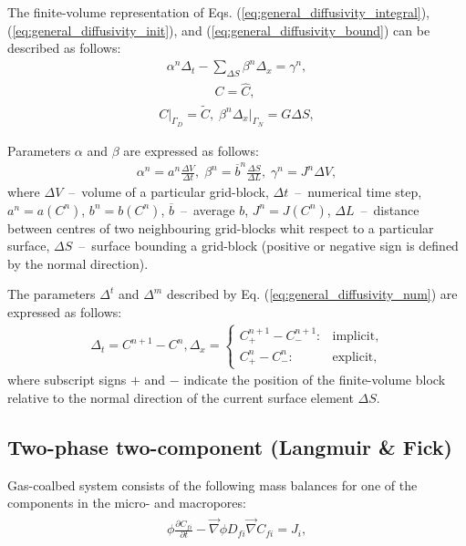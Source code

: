 \documentclass[a4paper,14pt,english]{extreport}
\begin{document}
The finite-volume representation of Eqs. (\ref{eq:general_diffusivity_integral}), (\ref{eq:general_diffusivity_init}), and (\ref{eq:general_diffusivity_bound}) can be described as follows:
    \begin{eqnarray}
        \label{eq:general_diffusivity_num}
        \alpha^n \Delta_{t} - \sum_{\Delta S} \beta^n\Delta_{x} = \gamma^n,
    \end{eqnarray}
    \begin{eqnarray}
         \label{eq:general_diffusivity_num_init}
        C = \hat{C}, \; 
    \end{eqnarray}
    \begin{eqnarray}
    \label{eq:general_diffusivity_num_bound}
    C \Big|_{\mathit{\Gamma}_D}= \tilde{C}, \; \beta^n\Delta_x \Big|_{\mathit{\Gamma}_N} = G\Delta S,
    \end{eqnarray}

Parameters $\alpha$ and $\beta$ are expressed as follows:
    \begin{eqnarray}
        \label{eq:general_alpha_beta_gamma}
        \alpha^n = a^n\frac{\Delta V}{\Delta t}, \;
        \beta^n = \overline{b}^n\frac{\Delta S}{\Delta L}, \; \gamma^n = J^n \Delta V,
    \end{eqnarray}
where $\Delta V$~--~volume of a particular grid-block, $\Delta t$~--~numerical time step, $a^n = a\left(C^n\right)$, $b^n = b\left(C^n\right)$, $\overline{b}$~--~average $b$, $J^n=J\left(C^n\right)$, $\Delta L$~--~distance between centres of two neighbouring grid-blocks whit respect to a particular surface, $\Delta S$~--~surface bounding a grid-block (positive or negative sign is defined by the normal direction).

The parameters $\Delta^{t}$ and $\Delta^{m}$ described by Eq. (\ref{eq:general_diffusivity_num}) are expressed as follows:
    \begin{eqnarray}
    \label{eq:general_delta_num}
    \Delta_t = C^{n+1} - C^{n}, \Delta_x = \begin{cases}
    C_{+}^{n+\mathit1} - C_{-}^{n+\mathit1} : &\text{implicit},\\
        C_{+}^{n} - C_{-}^{n} : &\text{explicit},
    \end{cases}
    \end{eqnarray}
where subscript signs $+$ and $-$ indicate the position of the finite-volume block relative to the normal direction of the current surface element $\Delta S$.

\subsection*{Two-phase two-component (Langmuir \& Fick)}
Gas-coalbed system consists of the following mass balances for one of the components in the micro- and macropores:
\begin{eqnarray}
\begin{gathered}
\label{eq:multiphase_free_diffusivity_differential}
\phi \frac{\partial C_{fi}}{\partial t}  - \vec{\nabla} \phi D_{fi} \vec{\nabla}C_{fi} = J_i,
\end{gathered}
\end{eqnarray}
\end{document}
